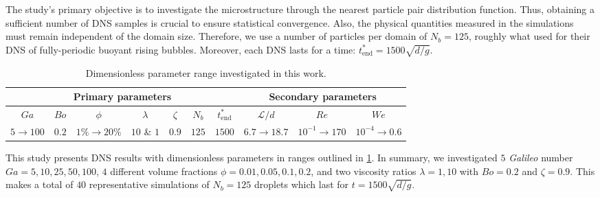 

The study's primary objective is to investigate the microstructure through the nearest particle pair distribution function.
Thus, obtaining a sufficient number of DNS samples is crucial to ensure statistical convergence. 
Also, the physical quantities measured in the simulations must remain independent of the domain size. 
Therefore, we use a number of particles per domain of $N_b = 125$, roughly what \citet{hidman2023assessing} used for their DNS of fully-periodic buoyant rising bubbles.
Moreover, each DNS lasts for a time: $t^*_\text{end} = 1500 \sqrt{d/g}$.
\begin{table}[h!]
    \centering
    \caption{Dimensionless parameter range investigated in this work.}
    \begin{tabular}{|ccccccc|ccc|}\hline
        \multicolumn{7}{|c|}{Primary parameters}&\multicolumn{3}{|c|}{Secondary parameters}\\\hline\hline
        $Ga$&$Bo$&$\phi$&$\lambda$&$\zeta$&$N_b$&$t^*_\text{end}$&$\mathcal{L}/d$&$Re$&$We$\\ \hline
        $5\rightarrow 100$&$0.2$&$1\% \rightarrow 20\%$&$10$ \& $1$&$0.9$&$125$&$1500$&$6.7\to 18.7$&$10^{-1}\to 170$&$10^{-4}\to 0.6$\\ \hline
    \end{tabular}
    \label{tab:simulations}
\end{table}
This study presents DNS results with dimensionless parameters in ranges outlined in \ref{tab:simulations}.
In summary, we investigated $5$ \textit{Galileo} number $Ga = 5,10,25,50,100$, $4$ different volume fractions $\phi = 0.01,0.05,0.1,0.2$, and two viscosity ratios $\lambda =1,10$ with $Bo = 0.2$ and $\zeta = 0.9$. %
This makes a total of $40$ representative simulations of $N_b = 125$ droplets which last for $t= 1500 \sqrt{d/g}$. 


